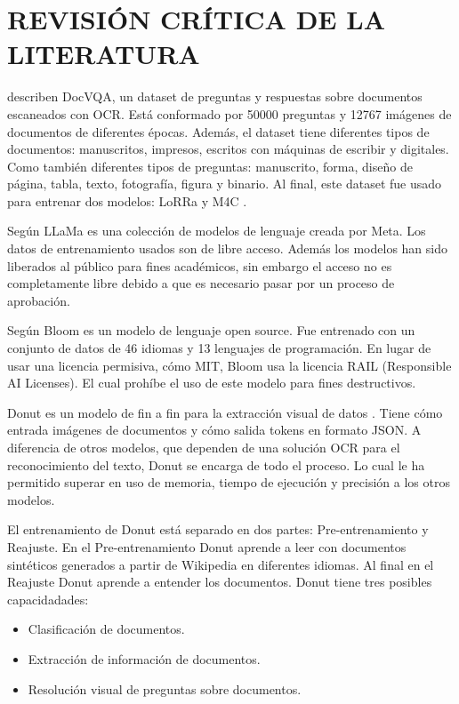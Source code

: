 \documentclass[../main.tex]{subfiles}
\begin{document}
\chapter{REVISIÓN CRÍTICA DE LA LITERATURA}

\citet{mathew2021docvqa} describen DocVQA,
un dataset de preguntas y respuestas sobre documentos escaneados con OCR.
Está conformado por 50000 preguntas y 12767 imágenes de documentos de diferentes épocas.
Además, el dataset tiene diferentes tipos de documentos:
manuscritos, impresos, escritos con máquinas de escribir y digitales.
Como también diferentes tipos de preguntas:
manuscrito, forma, diseño de página, tabla, texto, fotografía, figura y binario.
Al final, este dataset fue usado para entrenar dos modelos:
LoRRa \cite{anderson2018bottomup} y M4C \cite{devlin2019bert}.

Según \citet{touvron2023llama} LLaMa es una colección de modelos de lenguaje creada por Meta.
Los datos de entrenamiento usados son de libre acceso.
Además los modelos han sido liberados al público para fines académicos,
sin embargo el acceso no es completamente libre debido a que es necesario pasar por un proceso de aprobación.

Según \citet{workshop2023bloom}
Bloom es un modelo de lenguaje open source.
Fue entrenado con un conjunto de datos de 46 idiomas y 13 lenguajes de programación.
En lugar de usar una licencia permisiva, cómo MIT, Bloom usa la licencia RAIL (Responsible AI Licenses).
El cual prohíbe el uso de este modelo para fines destructivos.

Donut es un modelo de fin a fin para la extracción visual de datos \cite{kim2022ocrfree}.
Tiene cómo entrada imágenes de documentos y cómo salida tokens en formato JSON.
A diferencia de otros modelos, que dependen de una solución OCR para el reconocimiento del texto,
Donut se encarga de todo el proceso.
Lo cual le ha permitido superar en uso de memoria, tiempo de ejecución y precisión a los otros modelos.

El entrenamiento de Donut está separado en dos partes: Pre-entrenamiento y Reajuste.
En el Pre-entrenamiento Donut aprende a leer con documentos sintéticos generados a partir de Wikipedia en diferentes idiomas.
Al final en el Reajuste Donut aprende a entender los documentos.
Donut tiene tres posibles capacidadades:
\begin{itemize}
	\item Clasificación de documentos.
	\item Extracción de información de documentos.
	\item Resolución visual de preguntas sobre documentos.
\end{itemize}
\end{document}
